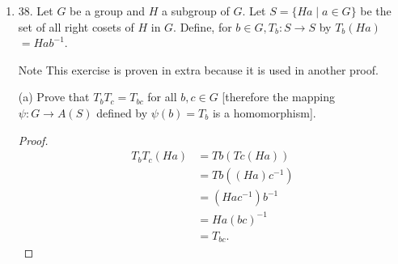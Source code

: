 \begin{enumerate}
\begin{proof}
	Now we prove $I(G) \triangleleft \mathscr{A}(G)$. It suffices to show that for all $\varphi \in \mathscr{A}(G)$, $\varphi^{-1} I(G) \varphi \subset I(G)$.
	Take any $a \in G$ and $\varphi \in \mathscr{A}(G)$, 
	\begin{align*}
		(\varphi^{-1} \sigma_a \varphi)(g)
		&= \varphi^{-1} \left( \sigma_a(\varphi(g)) \right)  \\
		&= \varphi^{-1} \left(a\varphi(g)a^{-1} \right) \\
		&= \varphi^{-1} (a)\varphi^{-1} (\varphi(g))\varphi^{-1} (a^{-1} ) 
		& \text{since $\varphi^{-1} $ is homomorphism}\\
		&= \varphi^{-1} (a)g\varphi^{-1} (a^{-1} ) 
		& \text{since $\varphi^{-1} \varphi=\iota_G$}\\
		&= \varphi^{-1} (a)g\left( \varphi^{-1} (a ) \right) ^{-1} 
		& \text{by property of homomorphism}\\
		&= \sigma_{\varphi^{-1} (a)}(g)
	.\end{align*}
Hence $\varphi^{-1} \sigma_a\varphi = \sigma_{\varphi^{-1} (a)} \in I(G)$. Therefore $\varphi^{-1} I(G) \varphi \subset I(G)$.
\end{proof}

\item 38. Let $G$ be a group and $H$ a subgroup of $G$. Let $S=\{H a \mid a \in G\}$ be the set of all right cosets of $H$ in $G$. Define, for $b \in G, T_b: S \rightarrow S$ by $T_b(H a)$ $=H a b^{-1}$.
\begin{note}{Note}
	\color{blue} This exercise is proven in extra because it is used in another proof.
\end{note}
(a) Prove that $T_b T_c=T_{b c}$ for all $b, c \in G$ [therefore the mapping $\psi: G \rightarrow A(S)$ defined by $\psi(b)=T_b$ is a homomorphism].
\begin{proof}
	\begin{align*}
		T_b T_c (Ha)&=Tb(Tc(Ha))  \\
		&= Tb((Ha)c^{-1} ) \\
		&= (Hac^{-1} )b^{-1}  \\
		&= Ha(bc)^{-1} \\
		&= T_{bc}
	.\end{align*}
\end{proof}


\end{enumerate}
